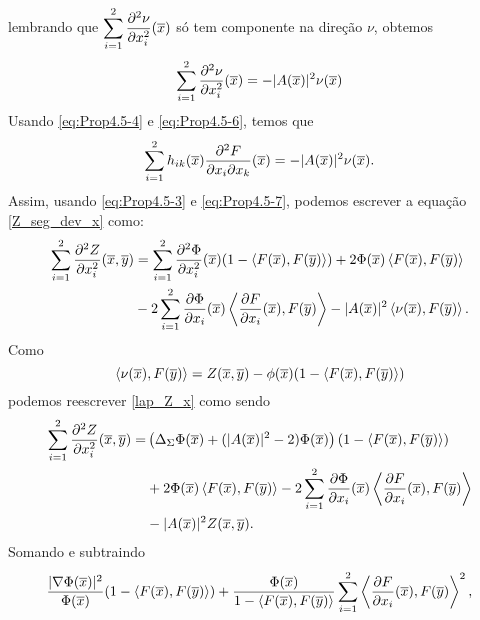 \begin{demonstracao}
	lembrando que 
	$\displaystyle\sum_{i=1}^2 \frac{\partial^2 \nu}{\partial x_i^2}(\overline{x})$ 
	só tem componente na direção $\nu$, obtemos
	\begin{eqnarray} \label{eq:Prop4.5-6}	
	\sum_{i=1}^2 \frac{\partial^2 \nu}{\partial x_i^2}(\overline{x}) = - | A(\overline{x}) |^2 \nu(\overline{x})
	\end{eqnarray}
	Usando \eqref{eq:Prop4.5-4} e \eqref{eq:Prop4.5-6}, temos que
	\begin{eqnarray} \label{eq:Prop4.5-7}
	\sum_{i=1}^2 h_{ik}(\overline{x}) \frac{\partial^2 F}{\partial x_i \partial x_k}(\overline{x}) 
	= - | A(\overline{x}) |^2 \nu(\overline{x}).
	\end{eqnarray}	
	Assim, usando \eqref{eq:Prop4.5-3} e \eqref{eq:Prop4.5-7}, podemos
	escrever a equa\c c\~ao \eqref{Z_seg_dev_x} como:
	\begin{eqnarray}
	\begin{aligned} \label{lap_Z_x}
	\sum_{i=1}^2 \frac{\partial^2 Z}{\partial x_i^2}(\overline{x},\overline{y}) & =   
	\sum_{i=1}^2 \frac{\partial^2 \Phi}{\partial x_i^2}(\overline{x})
	(1 - \langle F(\overline{x}), F(\overline{y}) \rangle)    
	+ 2  \Phi(\overline{x}) \left\langle F(\overline{x}), F(\overline{y}) \right\rangle \\
	& -2 \sum_{i=1}^2 \frac{\partial \Phi}{\partial x_i}(\overline{x}) 
	\left\langle \frac{\partial F}{\partial x_i}(\overline{x}), F(\overline{y}) \right\rangle
	- | A(\overline{x}) |^2 \left\langle \nu(\overline{x}), F(\overline{y}) \right\rangle.
	\end{aligned}
	\end{eqnarray}
	Como
	\[
	\left\langle \nu(\overline{x}), F(\overline{y}) \right\rangle = Z(\overline{x},\overline{y})
	-\phi(\overline{x})(1-\langle F(\overline{x}),F(\overline{y})\rangle)
	\]
	podemos reescrever \eqref{lap_Z_x} como sendo
	\begin{eqnarray*}
		\begin{aligned}
			\sum_{i=1}^2 \frac{\partial^2 Z}{\partial x_i^2}(\overline{x},\overline{y}) = &
			\left(\Delta_{\Sigma} \Phi(\overline{x}) + 
			(|A(\overline{x})|^2 - 2)\Phi(\overline{x})\right)(1 - \langle F(\overline{x}), F(\overline{y}) \rangle) \\
			&+ 2 \Phi(\overline{x}) \left\langle F(\overline{x}), F(\overline{y}) \right\rangle
			- 2 \sum_{i=1}^2 \frac{\partial \Phi}{\partial x_i}(\overline{x}) 
			\left\langle \frac{\partial F}{\partial x_i}(\overline{x}), F(\overline{y}) \right\rangle \\
			&- |A(\overline{x})|^2Z(\overline{x},\overline{y}).
		\end{aligned}
	\end{eqnarray*}	
	Somando e subtraindo
	\[
	\frac{|\nabla \Phi(\overline{x})|^2}{\Phi(\overline{x})} (1 - \langle F(\overline{x}), F(\overline{y}) \rangle) + \frac{\Phi(\overline{x})}{1 - \langle F(\overline{x}),F(\overline{y}) \rangle} \sum_{i=1}^2 \left\langle \frac{\partial F}{\partial x_i} (\overline{x}), F(\overline{y}) \right\rangle^2,
\]
\end{demonstracao}
